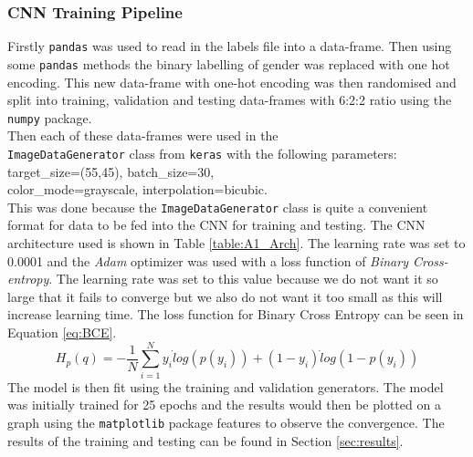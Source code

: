 \documentclass{article}
\begin{document}
 	\subsubsection{CNN Training Pipeline}
 	Firstly \verb|pandas| was used to read in the labels file into a data-frame. Then using some \verb|pandas| methods the binary labelling of gender was replaced with one hot encoding. This new data-frame with one-hot encoding was then randomised and split into training, validation and testing data-frames with 6:2:2 ratio using the \verb|numpy| package.\\
 	
 	Then each of these data-frames were used in the \\ \verb|ImageDataGenerator| class from \verb|keras| with the following parameters: target\_size=(55,45), batch\_size=30,\\ color\_mode=grayscale, interpolation=bicubic.\\
 	
 	This was done because the \verb|ImageDataGenerator| class is quite a convenient format for data to be fed into the CNN for training and testing. The CNN architecture used is shown in Table \ref{table:A1_Arch}. The learning rate was set to 0.0001 and the \textit{Adam} optimizer was used with a loss function of \textit{Binary Cross-entropy}. The learning rate was set to this value because we do not want it so large that it fails to converge but we also do not want it too small as this will increase learning time. The loss function for Binary Cross Entropy can be seen in Equation \ref{eq:BCE}.
 	\begin{equation}\label{eq:BCE}
 		H_p(q) = - \frac{1}{N} \sum_{i=1}^{N} y_i \dot log(p(y_i)) + (1-y_i) \dot log(1-p(y_i)) 
 	\end{equation}
 	 The model is then fit using the training and validation generators. The model was initially trained for 25 epochs and the results would then be plotted on a graph using the \verb|matplotlib| package features to observe the convergence. The results of the training and testing can be found in Section \ref{sec:results}.
 	
\end{document}
